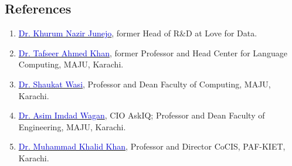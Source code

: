 \documentclass[a4paper, 10pt]{article}
\begin{document}
\subsection*{\textcolor{NavyBlue}{References}}
\begin{enumerate}
\itemsep-4pt
\item \href{https://www.linkedin.com/in/knjunejo/}{\textcolor{MediumBlue}{Dr. Khurum Nazir Junejo}}, former Head of R\&D at Love for Data.
\item \href{https://www.linkedin.com/in/tafseer-ahmed-8231a22/}{\textcolor{MediumBlue}{Dr. Tafseer Ahmed Khan}}, former Professor and Head Center for Language Computing, MAJU, Karachi.
\item \href{https://www.linkedin.com/in/shaukatwasi/}{\textcolor{MediumBlue}{Dr. Shaukat Wasi}}, Professor and Dean Faculty of Computing, MAJU, Karachi.
\item \href{https://www.linkedin.com/in/aiwagan/}{\textcolor{MediumBlue}{Dr. Asim Imdad Wagan}}, CIO AskIQ; Professor and Dean Faculty of Engineering, MAJU, Karachi.
\item \href{https://www.linkedin.com/in/mkhalidkhan78/}{\textcolor{MediumBlue}{Dr. Muhammad Khalid Khan}}, Professor and Director CoCIS, PAF-KIET, Karachi.
\end{enumerate}
\vfill
\end{document}
